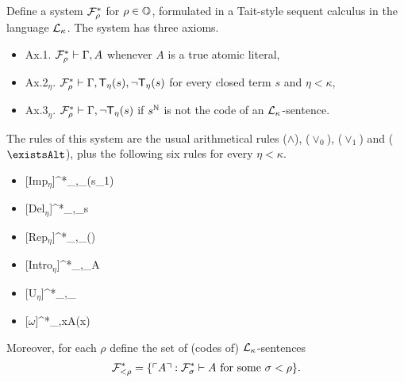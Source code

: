 \documentclass[UKenglish,cleveref,DIV=12]{scrartcl}
\let\forall\forallAlt
\let\exists\existsAlt
\theoremstyle{definition}
\theoremstyle{definition}
\begin{document}
Define a system $\mathcal{F}^*_\rho$ for $\rho\in\mathbb{O}$, formulated in a Tait-style
sequent calculus in the language $\mathcal{L}_\kappa$. The system has three axioms.
\begin{itemize}
 \item Ax.1. $\mathcal{F}^*_\rho\vdash\Gamma,A$ whenever $A$ is a true atomic literal,
 \item Ax.2$_\eta$. $\mathcal{F}^*_\rho\vdash\Gamma,\mathsf{T}_\eta(s),\lnot \mathsf{T}_\eta(s)$ for every closed term $s$ and $\eta<\kappa$,
 \item Ax.3$_\eta$. $\mathcal{F}^*_\rho\vdash\Gamma,\lnot \mathsf{T}_\eta(s)$ if $s^\mathbb N$ is not the code of an $\mathcal{L}_\kappa$-sentence.
\end{itemize}
The rules of this system are the usual arithmetical rules ($\land$), ($\lor_0$), ($\lor_1$) and ($\exists$), plus the following six rules for every $\eta<\kappa$.
\begin{itemize}
\item %
	\begin{prooftree}
	[Imp$_\eta$]{\FF^*_\rho\proves\Gamma,\T_\eta(s_1)}
  \end{prooftree}
\item %
	\begin{prooftree}
	\hypo{\xi < \beta}
	[Del$_\eta$]{\FF^*_\rho\proves\Gamma,\T_\eta s}
  \end{prooftree}
\item %
	\begin{prooftree}
	\hypo{\xi < \eta }
	[Rep$_\eta$]{\FF^*_\rho\proves\Gamma,\T_\eta ()}
  \end{prooftree}
\item %
	\begin{prooftree}
		\hypo{\sigma < \rho |_\eta }
	[Intro$_\eta$]{\FF^*_\rho\proves\Gamma,\T_\eta \gn A }
  \end{prooftree}
\item %
	\begin{prooftree}
	[U$_\eta$]{\FF^*_\rho\proves \Gamma,\T_\eta \gn{\forall xA(x)} }
  \end{prooftree}
\item %
	\begin{prooftree}
	[$\omega$]{\FF^*_\rho\proves\Gamma,\forall xA(x)}
  \end{prooftree}
\end{itemize}
Moreover, for each $\rho$ define the set of (codes of) $\mathcal{L}_\kappa$-sentences
\begin{align*}
	\mathcal{F}^*_{<\rho}=\{\ulcorner{A}\urcorner:\mathcal{F}^*_\sigma\vdash A\text{ for some $\sigma<\rho$}\}.
\end{align*}
\end{document}

